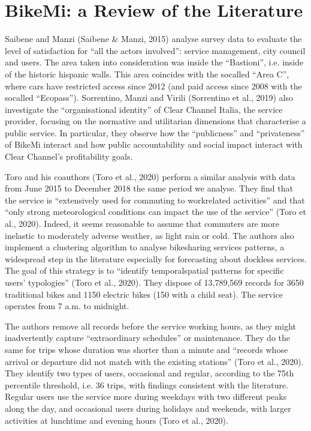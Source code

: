 \documentclass[letterpaper,10pt,english]{jupyterBook}
\begin{document}
\section{BikeMi: a Review of the Literature}
\label{\detokenize{02-bikesharing_and_bikemi:bikemi-a-review-of-the-literature}}
\sphinxAtStartPar
Saibene and Manzi (Saibene \& Manzi, 2015) analyse survey data to evaluate the level of satisfaction for “all the actors involved”: service management, city council and users. The area taken into consideration was inside the “Bastioni”, i.e. inside of the historic hispanic walls. This area coincides with the so\sphinxhyphen{}called “Area C”, where cars have restricted access since 2012 (and paid access since 2008 with the so\sphinxhyphen{}called “Ecopass”). Sorrentino, Manzi and Virili (Sorrentino et al., 2019) also investigate the “organisational identity” of Clear Channel Italia, the service provider, focusing on the normative and utilitarian dimensions that characterise a public service. In particular, they observe how the “publicness” and “privateness” of BikeMi interact and how public accountability and social impact interact with Clear Channel’s profitability goals.

\sphinxAtStartPar
Toro and his coauthors (Toro et al., 2020) perform a similar analysis with data from June 2015 to December 2018 \sphinxhyphen{} the same period we analyse. They find that the service is “extensively used for commuting to work\sphinxhyphen{}related activities” and that “only strong meteorological conditions can impact the use of the service” (Toro et al., 2020). Indeed, it seems reasonable to assume that commuters are more inelastic to moderately adverse weather, as light rain or cold. The authors also implement a clustering algorithm to analyse bike\sphinxhyphen{}sharing services patterns, a widespread step in the literature \sphinxhyphen{} especially for forecasting about dockless services. The goal of this strategy is to “identify temporal\sphinxhyphen{}spatial patterns for specific users’ typologies” (Toro et al., 2020). They dispose of 13,789,569 records for 3650 traditional bikes and 1150 electric bikes (150 with a child seat). The service operates from 7 a.m. to midnight.

\sphinxAtStartPar
The authors remove all records before the service working hours, as they might inadvertently capture “extraordinary schedules” or maintenance. They do the same for trips whose duration was shorter than a minute and “records whose arrival or departure did not match with the existing stations” (Toro et al., 2020). They identify two types of users, occasional and regular, according to the 75th percentile threshold, i.e. 36 trips, with findings consistent with the literature. Regular users use the service more during weekdays with two different peaks along the day, and occasional users during holidays and weekends, with larger activities at lunchtime and evening hours (Toro et al., 2020).
\end{document}
